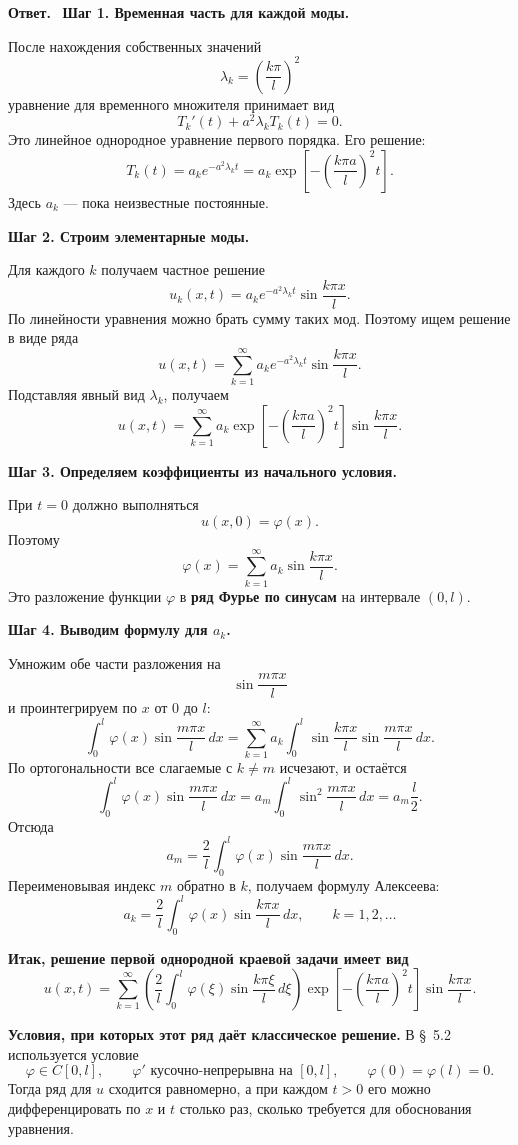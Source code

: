 \documentclass[a4paper,12pt]{article}
\newcommand{\Answer}{\textbf{Ответ.}\ }
\begin{document}
\Answer
\textbf{Шаг 1. Временная часть для каждой моды.}

После нахождения собственных значений
\[
\lambda_k=\left(\frac{k\pi}{l}\right)^2
\]
уравнение для временного множителя принимает вид
\[
T_k'(t)+a^2\lambda_k T_k(t)=0.
\]
Это линейное однородное уравнение первого порядка. Его решение:
\[
T_k(t)=a_ke^{-a^2\lambda_kt}
=a_k\exp\!\left[-\left(\frac{k\pi a}{l}\right)^2t\right].
\]
Здесь $a_k$ --- пока неизвестные постоянные.

\textbf{Шаг 2. Строим элементарные моды.}

Для каждого $k$ получаем частное решение
\[
u_k(x,t)=a_ke^{-a^2\lambda_kt}\sin\frac{k\pi x}{l}.
\]
По линейности уравнения можно брать сумму таких мод. Поэтому ищем решение в виде ряда
\[
u(x,t)=\sum_{k=1}^{\infty}
a_ke^{-a^2\lambda_kt}\sin\frac{k\pi x}{l}.
\]
Подставляя явный вид $\lambda_k$, получаем
\[
u(x,t)=\sum_{k=1}^{\infty}
a_k\exp\!\left[-\left(\frac{k\pi a}{l}\right)^2t\right]
\sin\frac{k\pi x}{l}.
\]

\textbf{Шаг 3. Определяем коэффициенты из начального условия.}

При $t=0$ должно выполняться
\[
u(x,0)=\varphi(x).
\]
Поэтому
\[
\varphi(x)=\sum_{k=1}^{\infty}a_k\sin\frac{k\pi x}{l}.
\]
Это разложение функции $\varphi$ в \textbf{ряд Фурье по синусам} на интервале $(0,l)$.

\textbf{Шаг 4. Выводим формулу для \texorpdfstring{$a_k$}{ak}.}

Умножим обе части разложения на
\[
\sin\frac{m\pi x}{l}
\]
и проинтегрируем по $x$ от $0$ до $l$:
\[
\int_0^l \varphi(x)\sin\frac{m\pi x}{l}\,dx
=
\sum_{k=1}^{\infty}
a_k
\int_0^l
\sin\frac{k\pi x}{l}\sin\frac{m\pi x}{l}\,dx.
\]
По ортогональности все слагаемые с $k\ne m$ исчезают, и остаётся
\[
\int_0^l \varphi(x)\sin\frac{m\pi x}{l}\,dx
=
a_m\int_0^l \sin^2\frac{m\pi x}{l}\,dx
=a_m\frac{l}{2}.
\]
Отсюда
\[
a_m=\frac{2}{l}\int_0^l \varphi(x)\sin\frac{m\pi x}{l}\,dx.
\]
Переименовывая индекс $m$ обратно в $k$, получаем формулу Алексеева:
\[
a_k=\frac{2}{l}\int_0^l \varphi(x)\sin\frac{k\pi x}{l}\,dx,
\qquad
k=1,2,\dots
\]

\textbf{Итак, решение первой однородной краевой задачи имеет вид}
\[
u(x,t)=\sum_{k=1}^{\infty}
\left(
\frac{2}{l}\int_0^l \varphi(\xi)\sin\frac{k\pi \xi}{l}\,d\xi
\right)
\exp\!\left[-\left(\frac{k\pi a}{l}\right)^2t\right]
\sin\frac{k\pi x}{l}.
\]

\textbf{Условия, при которых этот ряд даёт классическое решение.}
В \S~5.2 используется условие
\[
\varphi\in C[0,l],
\qquad
\varphi' \text{ кусочно-непрерывна на } [0,l],
\qquad
\varphi(0)=\varphi(l)=0.
\]
Тогда ряд для $u$ сходится равномерно, а при каждом $t>0$ его можно дифференцировать по $x$ и $t$ столько раз, сколько требуется для обоснования уравнения.
\end{document}
